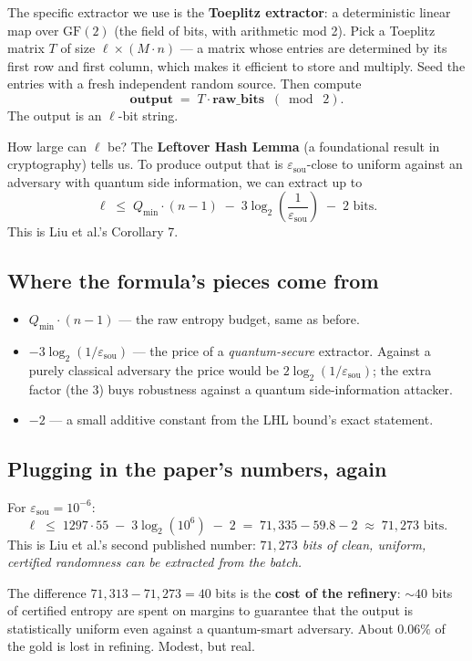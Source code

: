 \documentclass[11pt]{article}
\newcommand{\formula}[1]{\[\boxed{#1}\]}
\newcommand{\Qmin}{Q_{\min}}
\newcommand{\eps}{\varepsilon}
\newcommand{\epssou}{\eps_{\text{sou}}}
\begin{document}
The specific extractor we use is the \textbf{Toeplitz extractor}: a deterministic linear map over $\text{GF}(2)$ (the field of bits, with arithmetic mod 2). Pick a Toeplitz matrix $T$ of size $\ell \times (M \cdot n)$ --- a matrix whose entries are determined by its first row and first column, which makes it efficient to store and multiply. Seed the entries with a fresh independent random source. Then compute
\formula{\mathbf{output} \;=\; T \cdot \mathbf{raw\_bits} \;\;(\bmod\; 2).}
The output is an $\ell$-bit string.

How large can $\ell$ be? The \textbf{Leftover Hash Lemma} (a foundational result in cryptography) tells us. To produce output that is $\epssou$-close to uniform against an adversary with quantum side information, we can extract up to
\formula{\ell \;\leq\; \Qmin \cdot (n-1) \;-\; 3\log_2\!\left(\frac{1}{\epssou}\right) \;-\; 2 \text{ bits.}}
This is Liu et al.'s Corollary 7.

\subsection*{Where the formula's pieces come from}

\begin{itemize}[leftmargin=2em, itemsep=4pt]
\item \textbf{$\Qmin \cdot (n-1)$} --- the raw entropy budget, same as before.
\item \textbf{$-3 \log_2(1/\epssou)$} --- the price of a \emph{quantum-secure} extractor. Against a purely classical adversary the price would be $2 \log_2(1/\epssou)$; the extra factor (the $3$) buys robustness against a quantum side-information attacker.
\item \textbf{$-2$} --- a small additive constant from the LHL bound's exact statement.
\end{itemize}

\subsection*{Plugging in the paper's numbers, again}

For $\epssou = 10^{-6}$:
\[
\ell \;\leq\; 1297 \cdot 55 \;-\; 3 \log_2(10^6) \;-\; 2
\;=\; 71{,}335 - 59.8 - 2
\;\approx\; \boxed{71{,}273 \text{ bits}}.
\]
This is Liu et al.'s second published number: \emph{$71{,}273$ bits of clean, uniform, certified randomness can be extracted from the batch.}

The difference $71{,}313 - 71{,}273 = 40$ bits is the \textbf{cost of the refinery}: $\sim 40$ bits of certified entropy are spent on margins to guarantee that the output is statistically uniform even against a quantum-smart adversary. About $0.06\%$ of the gold is lost in refining. Modest, but real.
\end{document}
